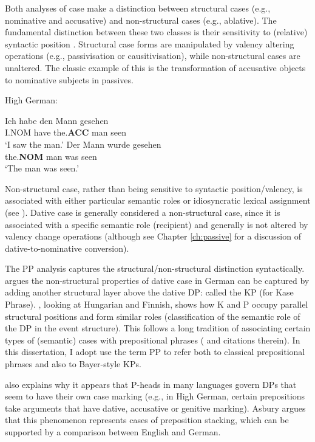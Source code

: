 Both analyses of case make a distinction between structural cases (e.g., nominative and accusative) and non-structural cases (e.g., ablative). The fundamental distinction between these two classes is their sensitivity to (relative) syntactic position \citep{Woolford.2006}. Structural case forms are manipulated by valency altering operations (e.g., passivisation or causitivisation), while non-structural cases are unaltered. The classic example of this is the transformation of accusative objects to nominative subjects in passives.

\begin{exe}
	\ex High German:\label{ex:hg-accnom}
	\begin{xlist}
		\ex \gll Ich habe den Mann gesehen\\
		I.NOM have the.\textbf{ACC} man seen\\
		\trans `I saw the man.'
		\ex \gll Der Mann wurde gesehen\\
		the.\textbf{NOM} man was seen\\
		\trans `The man was seen.'
	\end{xlist}
\end{exe}

Non-structural case, rather than being sensitive to syntactic position/valency, is associated with either particular semantic roles or idiosyncratic lexical assignment (see \citealt{Woolford.2006}). Dative case is generally considered a non-structural case, since it is associated with a specific semantic role (recipient) and generally is not altered by valency change operations (although see Chapter \ref{ch:passive} for a discussion of dative-to-nominative conversion). 

The PP analysis captures the structural/non-structural distinction syntactically. \cite{Bayer.2001} argues the non-structural properties of dative case in German can be captured by adding another structural layer above the dative DP: called the KP (for Kase Phrase). \cite{Asbury.2005,Asbury.2007}, looking at Hungarian and Finnish, shows how K and P occupy parallel structural positions and form similar roles (classification of the semantic role of the DP in the event structure). This follows a long tradition of associating certain types of (semantic) cases with prepositional phrases (\citealt{McFadden.2004} and citations therein). In this dissertation, I adopt use the term PP to refer both to classical prepositional phrases and also to Bayer-style KPs.

\cite{Asbury.2005} also explains why it appears that P-heads in many languages govern DPs that seem to have their own case marking (e.g., in High German, certain prepositions take arguments that have dative, accusative or genitive marking). Asbury argues that this phenomenon represents cases of preposition stacking, which can be supported by a comparison between English and German. 

